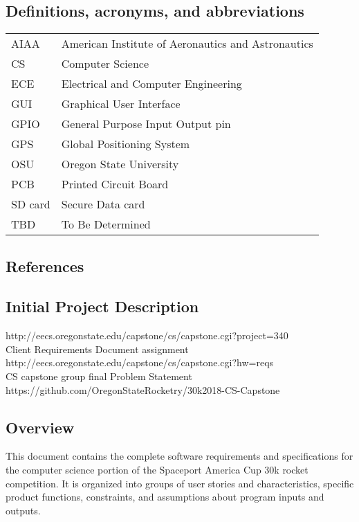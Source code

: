 \documentclass[onecolumn, draftclsnofoot, 10pt, compsoc]{IEEEtran}
\begin{document}
\subsection{Definitions, acronyms, and abbreviations}
\begin{center}
  \begin{tabular}{|l|l|}
      \hline
      AIAA	&American Institute of Aeronautics and Astronautics\\
      CS		&Computer Science\\
      \hline
      ECE		&Electrical and Computer Engineering\\
      GUI		&Graphical User Interface\\
      \hline
      GPIO	&General Purpose Input Output pin\\
      GPS		&Global Positioning System\\
      \hline
      OSU		&Oregon State University\\
      PCB		&Printed Circuit Board\\
      \hline
      SD card	&Secure Data card\\
      TBD		&To Be Determined\\
      \hline
  \end{tabular}
\end{center}

\subsection{References}
\subsection*{Initial Project Description}
http://eecs.oregonstate.edu/capstone/cs/capstone.cgi?project=340\\
Client Requirements Document assignment\\
http://eecs.oregonstate.edu/capstone/cs/capstone.cgi?hw=reqs\\
CS capstone group final Problem Statement\\
https://github.com/OregonStateRocketry/30k2018-CS-Capstone

\subsection{Overview}
This document contains the complete software requirements and specifications for the computer science portion of the Spaceport America Cup 30k rocket competition.  It is organized into groups of user stories and characteristics, specific product functions, constraints, and assumptions about program inputs and outputs.
\end{document}
